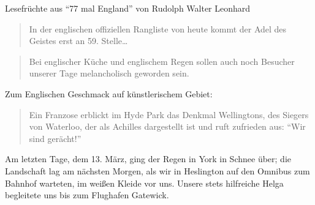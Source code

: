 Lesefrüchte aus \enquote{77 mal England} von Rudolph Walter Leonhard
\begin{quote}
	In der englischen offiziellen Rangliste von heute kommt der Adel des Geistes erst an 59. Stelle\dots
\end{quote}

\begin{quote}
	Bei englischer Küche und englischem Regen sollen auch noch Besucher unserer Tage melancholisch geworden sein.
\end{quote}

Zum Englischen Geschmack auf künstlerischem Gebiet:
\begin{quote}
	Ein Franzose erblickt im Hyde Park das Denkmal Wellingtons, des Siegers von Waterloo, der als Achilles dargestellt ist und ruft zufrieden aus: \enquote{Wir sind gerächt!}
\end{quote}

Am letzten Tage, dem 13. März, ging der Regen in York in Schnee über; die Landschaft lag am nächsten Morgen, als wir in Heslington auf den Omnibus zum Bahnhof warteten, im weißen Kleide vor uns. Unsere stets hilfreiche Helga begleitete uns bis zum Flughafen Gatewick.
